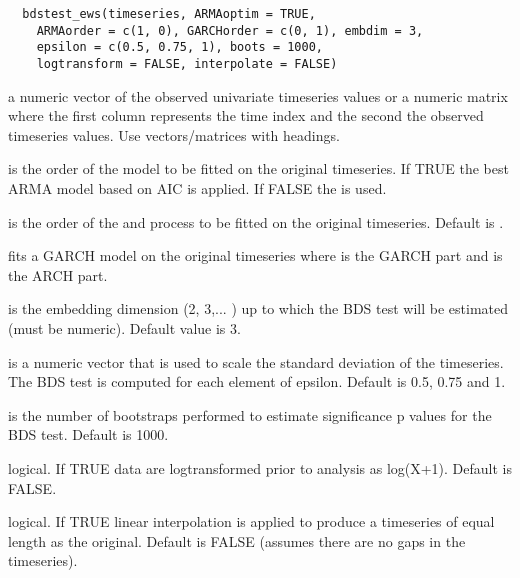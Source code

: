 \documentclass[a4paper]{book}
\begin{document}
%
\begin{Usage}
\begin{verbatim}
  bdstest_ews(timeseries, ARMAoptim = TRUE,
    ARMAorder = c(1, 0), GARCHorder = c(0, 1), embdim = 3,
    epsilon = c(0.5, 0.75, 1), boots = 1000,
    logtransform = FALSE, interpolate = FALSE)
\end{verbatim}
\end{Usage}
%
\begin{Arguments}
\begin{ldescription}
\item[\code{timeseries}] a numeric vector of the observed
univariate timeseries values or a numeric matrix where
the first column represents the time index and the second
the observed timeseries values. Use vectors/matrices with
headings.

\item[\code{ARMAoptim}] is the order of the 
model to be fitted on the original timeseries. If TRUE
the best ARMA model based on AIC is applied. If FALSE the
 is used.

\item[\code{ARMAorder}] is the order of the  and
 process to be fitted on the original
timeseries. Default is  .

\item[\code{GARCHorder}] fits a GARCH model on the original
timeseries where  is the GARCH part
and  is the ARCH part.

\item[\code{embdim}] is the embedding dimension (2, 3,...
) up to which the BDS test will be estimated
(must be numeric). Default value is 3.

\item[\code{epsilon}] is a numeric vector that is used to scale
the standard deviation of the timeseries. The BDS test is
computed for each element of epsilon. Default is 0.5,
0.75 and 1.

\item[\code{boots}] is the number of bootstraps performed to
estimate significance p values for the BDS test. Default
is 1000.

\item[\code{logtransform}] logical. If TRUE data are
logtransformed prior to analysis as log(X+1). Default is
FALSE.

\item[\code{interpolate}] logical. If TRUE linear interpolation
is applied to produce a timeseries of equal length as the
original. Default is FALSE (assumes there are no gaps in
the timeseries).
\end{ldescription}
\end{Arguments}
\end{document}
